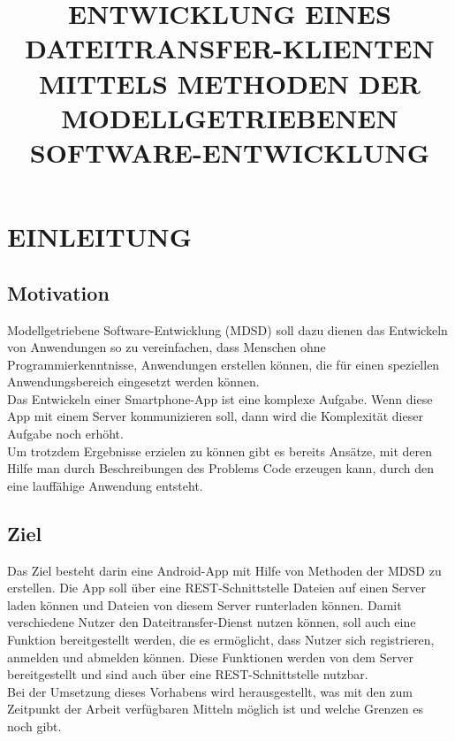 \documentclass[a4paper,twoside]{article}
\begin{document}
	
	\title{\uppercase{Entwicklung eines Dateitransfer-Klienten mittels Methoden der modellgetriebenen Software-entwicklung}}
	
	\author{
	}
	
	
	
	\onecolumn \maketitle \normalsize \vfill
	
	\section{\uppercase{Einleitung}}
	\label{sec:introduction}
	
	\subsection{Motivation}
	Modellgetriebene Software-Entwicklung (MDSD) soll dazu dienen das Entwickeln von Anwendungen so zu vereinfachen, dass Menschen ohne Programmierkenntnisse, Anwendungen erstellen k\"onnen, die f\"ur einen speziellen Anwendungsbereich eingesetzt werden k\"onnen.\\
	Das Entwickeln einer Smartphone-App ist eine komplexe Aufgabe. Wenn diese App mit einem Server kommunizieren soll, dann wird die Komplexit\"at dieser Aufgabe noch erh\"oht.\\
	Um trotzdem Ergebnisse erzielen zu k\"onnen gibt es bereits Ans\"atze, mit deren Hilfe man durch Beschreibungen des Problems Code erzeugen kann, durch den eine lauff\"ahige Anwendung entsteht. 
	
	\subsection{Ziel}
	Das Ziel besteht darin eine Android-App mit Hilfe von Methoden der MDSD zu erstellen. Die App soll \"uber eine REST-Schnittstelle Dateien auf einen Server laden k\"onnen und Dateien von diesem Server runterladen k\"onnen. Damit verschiedene Nutzer den Dateitransfer-Dienst nutzen k\"onnen, soll auch eine Funktion bereitgestellt werden, die es erm\"oglicht, dass Nutzer sich registrieren, anmelden und abmelden k\"onnen. Diese Funktionen werden von dem Server bereitgestellt und sind auch \"uber eine REST-Schnittstelle nutzbar.\\
	Bei der Umsetzung dieses Vorhabens wird herausgestellt, was mit den zum Zeitpunkt der Arbeit verf\"ugbaren Mitteln m\"oglich ist und welche Grenzen es noch gibt.
	
\end{document}

